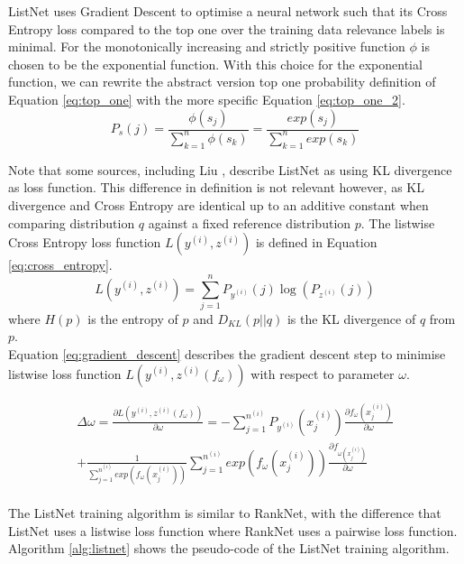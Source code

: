 ListNet uses Gradient Descent to optimise a neural network such that its Cross Entropy loss compared to the top one over the training data relevance labels is minimal. For the monotonically increasing and strictly positive function $\phi$ is chosen to be the exponential function. With this choice for the exponential function, we can rewrite the abstract version top one probability definition of Equation \ref{eq:top_one} with the more specific Equation \ref{eq:top_one_2}.\\
\begin{equation}
P_s(j) = \frac{\phi(s_j)}{\sum\nolimits_{k=1}^{n}\phi(s_k)} = \frac{exp(s_j)}{\sum\nolimits_{k=1}^{n}exp(s_k)}
\label{eq:top_one_2}
\end{equation}

Note that some sources, including Liu \cite{Liu2007}, describe ListNet as using \ac{KL divergence} as loss function. This difference in definition is not relevant however, as \ac{KL divergence} and Cross Entropy are identical up to an additive constant when comparing distribution $q$ against a fixed reference distribution $p$. The listwise Cross Entropy loss function $L(y^{(i)},z^{(i)})$ is defined in Equation \ref{eq:cross_entropy}.
\begin{equation}
L(y^{(i)},z^{(i)}) = \sum\limits_{j=1}^{n}P_{y^{(i)}}(j)\log(P_{z^{(i)}}(j))
\label{eq:cross_entropy}
\end{equation}
where $H(p)$ is the entropy of $p$ and $D_{KL}(p||q)$ is the \ac{KL divergence} of $q$ from $p$.\\

\noindent Equation \ref{eq:gradient_descent} describes the gradient descent step to minimise listwise loss function $L(y^{(i)},z^{(i)}(f_\omega))$ with respect to parameter $\omega$.

\begin{multline}
\Delta\omega = \frac{\partial L(y^{(i)},z^{(i)}(f_\omega))}{\partial \omega} = - \sum\limits_{j=1}^{n^{(i)}}P_{y^{(i)}}(x_{j}^{(i)})\frac{\partial f_{\omega}(x_{j}^{(i)})}{\partial\omega} \\ 
+ \frac{1}{\sum\nolimits_{j=1}^{n^{(i)}}exp(f_{\omega}(x_{j}^{(i)}))} \sum\limits_{j=1}^{n^{(i)}}exp(f_{\omega}(x_{j}^{(i)})) \frac{\partial f_{\omega(x_{j}^{(i)})}}{\partial\omega}
\label{eq:gradient_descent}
\end{multline}
\\
The ListNet training algorithm is similar to RankNet, with the difference that ListNet uses a listwise loss function where RankNet uses a pairwise loss function. Algorithm \ref{alg:listnet} shows the pseudo-code of the ListNet training algorithm.\\

